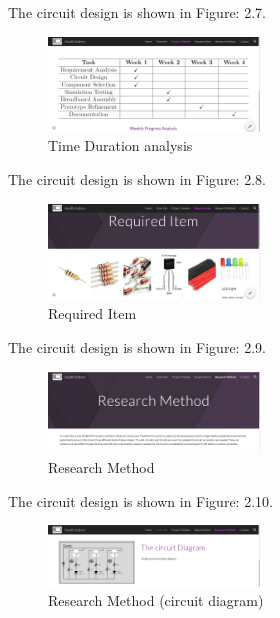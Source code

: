  \newline The circuit design is shown in Figure: 2.7.
\begin{figure}[h!] %
    \centering
    \includegraphics[width=0.5\textwidth]{5.png} %
    \caption{Time Duration analysis}
    \label{fig:sample}
\end{figure}
 \newline The circuit design is shown in Figure: 2.8.
\begin{figure}[h!] %
    \centering
    \includegraphics[width=0.5\textwidth]{6.png} %
    \caption{Required Item}
    \label{fig:sample}
\end{figure}
\newline
 \newline The circuit design is shown in Figure: 2.9.
\begin{figure}[h!] %
    \centering
    \includegraphics[width=0.5\textwidth]{7.png} %
    \caption{Research Method}
    \label{fig:sample}
\end{figure}
\newline
\pagebreak
 \newline The circuit design is shown in Figure: 2.10.
\begin{figure}[h!] %
    \centering
    \includegraphics[width=0.5\textwidth]{8.png} %
    \caption{Research Method (circuit diagram)}
    \label{fig:sample}
\end{figure}
